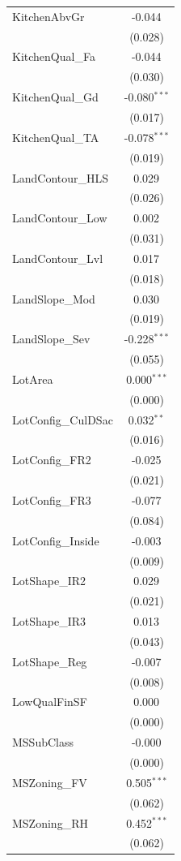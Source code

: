 \begin{table}[!htbp]
\begin{tabular}{@{\extracolsep{5pt}}lc}
 KitchenAbvGr & -0.044$^{}$ \\
& (0.028) \\
 KitchenQual\_Fa & -0.044$^{}$ \\
& (0.030) \\
 KitchenQual\_Gd & -0.080$^{***}$ \\
& (0.017) \\
 KitchenQual\_TA & -0.078$^{***}$ \\
& (0.019) \\
 LandContour\_HLS & 0.029$^{}$ \\
& (0.026) \\
 LandContour\_Low & 0.002$^{}$ \\
& (0.031) \\
 LandContour\_Lvl & 0.017$^{}$ \\
& (0.018) \\
 LandSlope\_Mod & 0.030$^{}$ \\
& (0.019) \\
 LandSlope\_Sev & -0.228$^{***}$ \\
& (0.055) \\
 LotArea & 0.000$^{***}$ \\
& (0.000) \\
 LotConfig\_CulDSac & 0.032$^{**}$ \\
& (0.016) \\
 LotConfig\_FR2 & -0.025$^{}$ \\
& (0.021) \\
 LotConfig\_FR3 & -0.077$^{}$ \\
& (0.084) \\
 LotConfig\_Inside & -0.003$^{}$ \\
& (0.009) \\
 LotShape\_IR2 & 0.029$^{}$ \\
& (0.021) \\
 LotShape\_IR3 & 0.013$^{}$ \\
& (0.043) \\
 LotShape\_Reg & -0.007$^{}$ \\
& (0.008) \\
 LowQualFinSF & 0.000$^{}$ \\
& (0.000) \\
 MSSubClass & -0.000$^{}$ \\
& (0.000) \\
 MSZoning\_FV & 0.505$^{***}$ \\
& (0.062) \\
 MSZoning\_RH & 0.452$^{***}$ \\
& (0.062) \\

\end{tabular}
\end{table}
